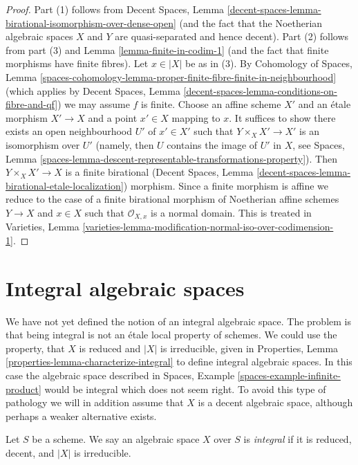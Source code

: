 \begin{proof}
Part (1) follows from Decent Spaces, Lemma
\ref{decent-spaces-lemma-birational-isomorphism-over-dense-open}
(and the fact that the Noetherian algebraic spaces $X$ and $Y$
are quasi-separated and hence decent).
Part (2) follows from part (3) and Lemma \ref{lemma-finite-in-codim-1}
(and the fact that finite morphisms have finite fibres).
Let $x \in |X|$ be as in (3). By
Cohomology of Spaces, Lemma
\ref{spaces-cohomology-lemma-proper-finite-fibre-finite-in-neighbourhood}
(which applies by Decent Spaces, Lemma
\ref{decent-spaces-lemma-conditions-on-fibre-and-qf})
we may assume $f$ is finite. Choose an affine scheme $X'$ and
an \'etale morphism $X' \to X$ and a point $x' \in X$ mapping to $x$.
It suffices to show there exists an open neighbourhood $U'$ of $x' \in X'$
such that $Y \times_X X' \to X'$ is an isomorphism over $U'$
(namely, then $U$ contains the image of $U'$ in $X$, see Spaces, Lemma
\ref{spaces-lemma-descent-representable-transformations-property}).
Then $Y \times_X X' \to X$ is a finite birational
(Decent Spaces, Lemma \ref{decent-spaces-lemma-birational-etale-localization})
morphism. Since a finite morphism is affine we reduce to
the case of a finite birational morphism of Noetherian affine schemes
$Y \to X$ and $x \in X$ such that $\mathcal{O}_{X, x}$ is a
normal domain. This is treated in Varieties, Lemma
\ref{varieties-lemma-modification-normal-iso-over-codimension-1}.
\end{proof}






\section{Integral algebraic spaces}
\label{section-integral-spaces}

\noindent
We have not yet defined the notion of an integral algebraic space. The
problem is that being integral is not an \'etale local property of schemes.
We could use the property, that $X$ is reduced and $|X|$ is irreducible,
given in Properties, Lemma \ref{properties-lemma-characterize-integral}
to define integral algebraic spaces. In this case the algebraic
space described in Spaces, Example \ref{spaces-example-infinite-product}
would be integral which does not seem right.
To avoid this type of pathology we will in addition assume that $X$ is a
decent algebraic space, although perhaps a weaker alternative exists.

\begin{definition}
\label{definition-integral-algebraic-space}
Let $S$ be a scheme. We say an algebraic space $X$ over $S$ is
{\it integral} if it is reduced, decent, and $|X|$ is irreducible.
\end{definition}

